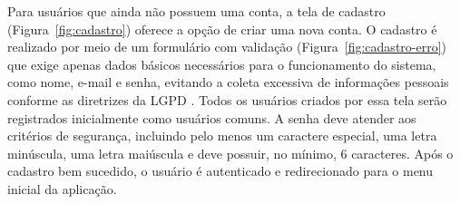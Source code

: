 Para usuários que ainda não possuem uma conta, a tela de cadastro (Figura~\ref{fig:cadastro})
oferece a opção de criar uma nova conta. O cadastro é realizado por meio de um formulário com validação 
(Figura~\ref{fig:cadastro-erro}) que exige apenas dados básicos necessários para o funcionamento do sistema, 
como nome, e-mail e senha, evitando a coleta excessiva de informações pessoais conforme as diretrizes da 
LGPD \cite{BRASIL2018lgpd}. Todos os usuários criados por essa tela serão registrados inicialmente como usuários 
comuns.
A senha deve atender aos critérios de segurança, incluindo pelo menos um caractere especial, uma letra minúscula, 
uma letra maiúscula e deve possuir, no mínimo, 6 caracteres. Após o cadastro bem sucedido, o usuário 
é autenticado e redirecionado para o menu inicial da aplicação.

\begin{figure}[H]
    \centering
    \begin{minipage}[t]{0.48\textwidth}
        \centering

\end{minipage}
\end{figure}
